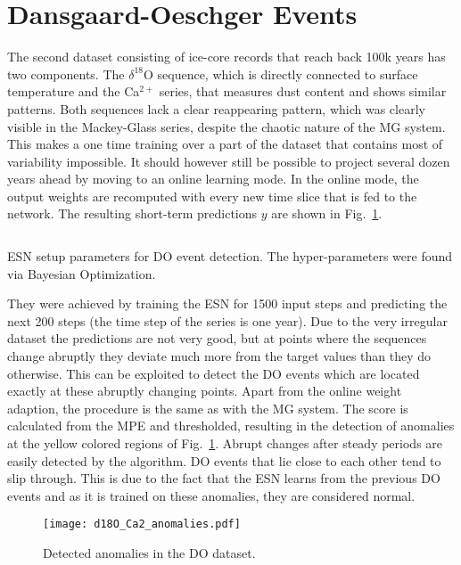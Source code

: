 \clearpage
\section{Dansgaard-Oeschger Events}%
\label{sec:res_dansgaard_oeschger_events}

The second dataset consisting of ice-core records that reach back 100k years
has two components. The $\delta^{18}$O sequence, which is directly connected to
surface temperature and the Ca$^{2+}$ series, that measures dust content and
shows similar patterns.  Both sequences lack a clear reappearing pattern, which
was clearly visible in the Mackey-Glass series, despite the chaotic nature of
the MG system. This makes a one time training over a part of the dataset that
contains most of variability impossible.  It should however still be possible
to project several dozen years ahead by moving to an online learning mode. In
the online mode, the output weights are recomputed with every new time slice
that is fed to the network.  The resulting short-term predictions $y$ are shown
in Fig.~\ref{fig:d18O_anomalies}.
\begin{listing}
  \inputminted{json}{pseudocode/model_setups/DO_setup.json}
  \label{lst:DO_setup}
  \caption{ESN setup parameters for DO event detection. The hyper-parameters were
  found via Bayesian Optimization.}
\end{listing}
They were achieved by training the ESN for 1500 input steps and predicting the
next 200 steps (the time step of the series is one year). Due to the very
irregular dataset the predictions are not very good, but at points where the
sequences change abruptly they deviate much more from the target values than
they do otherwise. This can be exploited to detect the DO events which are
located exactly at these abruptly changing points. Apart from the online weight
adaption, the procedure is the same as with the MG system. The score is calculated
from the MPE and thresholded, resulting in the detection of anomalies at the
yellow colored regions of Fig.~\ref{fig:d18O_anomalies}.
Abrupt changes after steady periods are easily detected by the algorithm.
DO events that lie close to each other tend to slip through. This is due to
the fact that the ESN learns from the previous DO events and as it is trained
on these anomalies, they are considered normal.
\begin{figure}
  \centering
  \texttt{[image: d18O\_Ca2\_anomalies.pdf]}
  \caption{Detected anomalies in the DO dataset.}
  \label{fig:d18O_anomalies}
\end{figure}




